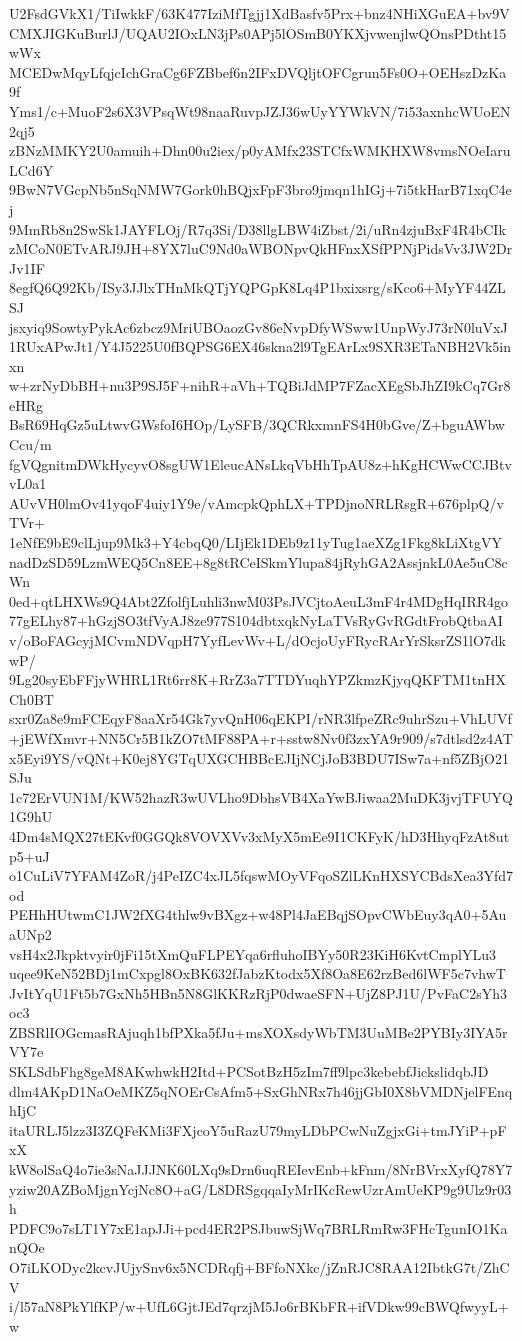 U2FsdGVkX1/TiIwkkF/63K477IziMfTgjj1XdBasfv5Prx+bnz4NHiXGuEA+bv9V
CMXJIGKuBurlJ/UQAU2IOxLN3jPs0APj5lOSmB0YKXjvwenjlwQOnsPDtht15wWx
MCEDwMqyLfqjcIchGraCg6FZBbef6n2IFxDVQljtOFCgrun5Fs0O+OEHszDzKa9f
Yms1/c+MuoF2s6X3VPsqWt98naaRuvpJZJ36wUyYYWkVN/7i53axnhcWUoEN2qj5
zBNzMMKY2U0amuih+Dhn00u2iex/p0yAMfx23STCfxWMKHXW8vmsNOeIaruLCd6Y
9BwN7VGcpNb5nSqNMW7Gork0hBQjxFpF3bro9jmqn1hIGj+7i5tkHarB71xqC4ej
9MmRb8n2SwSk1JAYFLOj/R7q3Si/D38llgLBW4iZbst/2i/uRn4zjuBxF4R4bCIk
zMCoN0ETvARJ9JH+8YX7luC9Nd0aWBONpvQkHFnxXSfPPNjPidsVv3JW2DrJv1IF
8egfQ6Q92Kb/ISy3JJlxTHnMkQTjYQPGpK8Lq4P1bxixsrg/sKco6+MyYF44ZLSJ
jsxyiq9SowtyPykAc6zbcz9MriUBOaozGv86eNvpDfyWSww1UnpWyJ73rN0luVxJ
1RUxAPwJt1/Y4J5225U0fBQPSG6EX46skna2l9TgEArLx9SXR3ETaNBH2Vk5inxn
w+zrNyDbBH+nu3P9SJ5F+nihR+aVh+TQBiJdMP7FZacXEgSbJhZI9kCq7Gr8eHRg
BsR69HqGz5uLtwvGWsfoI6HOp/LySFB/3QCRkxmnFS4H0bGve/Z+bguAWbwCcu/m
fgVQgnitmDWkHycyvO8sgUW1EleucANsLkqVbHhTpAU8z+hKgHCWwCCJBtvvL0a1
AUvVH0lmOv41yqoF4uiy1Y9e/vAmcpkQphLX+TPDjnoNRLRsgR+676plpQ/vTVr+
1eNfE9bE9clLjup9Mk3+Y4cbqQ0/LIjEk1DEb9z11yTug1aeXZg1Fkg8kLiXtgVY
nadDzSD59LzmWEQ5Cn8EE+8g8tRCeISkmYlupa84jRyhGA2AssjnkL0Ae5uC8cWn
0ed+qtLHXWs9Q4Abt2ZfolfjLuhli3nwM03PsJVCjtoAeuL3mF4r4MDgHqIRR4go
77gELhy87+hGzjSO3tfVyAJ8ze977S104dbtxqkNyLaTVsRyGvRGdtFrobQtbaAI
v/oBoFAGcyjMCvmNDVqpH7YyfLevWv+L/dOcjoUyFRycRArYrSksrZS1lO7dkwP/
9Lg20syEbFFjyWHRL1Rt6rr8K+RrZ3a7TTDYuqhYPZkmzKjyqQKFTM1tnHXCh0BT
sxr0Za8e9mFCEqyF8aaXr54Gk7yvQnH06qEKPI/rNR3lfpeZRc9uhrSzu+VhLUVf
+jEWfXmvr+NN5Cr5B1kZO7tMF88PA+r+sstw8Nv0f3zxYA9r909/s7dtlsd2z4AT
x5Eyi9YS/vQNt+K0ej8YGTqUXGCHBBcEJIjNCjJoB3BDU7ISw7a+nf5ZBjO21SJu
1c72ErVUN1M/KW52hazR3wUVLho9DbhsVB4XaYwBJiwaa2MuDK3jvjTFUYQ1G9hU
4Dm4sMQX27tEKvf0GGQk8VOVXVv3xMyX5mEe9I1CKFyK/hD3HhyqFzAt8utp5+uJ
o1CuLiV7YFAM4ZoR/j4PeIZC4xJL5fqswMOyVFqoSZlLKnHXSYCBdsXea3Yfd7od
PEHhHUtwmC1JW2fXG4thlw9vBXgz+w48Pl4JaEBqjSOpvCWbEuy3qA0+5AuaUNp2
vsH4x2Jkpktvyir0jFi15tXmQuFLPEYqa6rfluhoIBYy50R23KiH6KvtCmplYLu3
uqee9KeN52BDj1mCxpgl8OxBK632fJabzKtodx5Xf8Oa8E62rzBed6lWF5c7vhwT
JvItYqU1Ft5b7GxNh5HBn5N8GlKKRzRjP0dwaeSFN+UjZ8PJ1U/PvFaC2sYh3oc3
ZBSRlIOGcmasRAjuqh1bfPXka5fJu+msXOXsdyWbTM3UuMBe2PYBIy3IYA5rVY7e
SKLSdbFhg8geM8AKwhwkH2Itd+PCSotBzH5zIm7ff9lpc3kebebfJickslidqbJD
dlm4AKpD1NaOeMKZ5qNOErCsAfm5+SxGhNRx7h46jjGbI0X8bVMDNjelFEnqhIjC
itaURLJ5lzz3I3ZQFeKMi3FXjcoY5uRazU79myLDbPCwNuZgjxGi+tmJYiP+pFxX
kW8olSaQ4o7ie3sNaJJJNK60LXq9sDrn6uqREIevEnb+kFnm/8NrBVrxXyfQ78Y7
yziw20AZBoMjgnYcjNc8O+aG/L8DRSgqqaIyMrIKcRewUzrAmUeKP9g9Ulz9r03h
PDFC9o7sLT1Y7xE1apJJi+pcd4ER2PSJbuwSjWq7BRLRmRw3FHcTgunIO1KanQOe
O7iLKODyc2kcvJUjySnv6x5NCDRqfj+BFfoNXkc/jZnRJC8RAA12IbtkG7t/ZhCV
i/l57aN8PkYlfKP/w+UfL6GjtJEd7qrzjM5Jo6rBKbFR+ifVDkw99cBWQfwyyL+w

